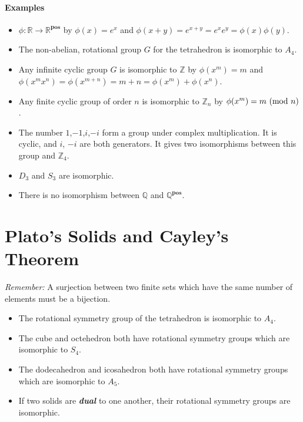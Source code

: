 \documentclass[a4paper,twocolumn,10pt]{article}
\begin{document}
  \paragraph{Examples}
  \begin{itemize}
    \item $\phi\colon \mathbb{R} \rightarrow \mathbb{R}^{\textbf{pos}}$ by
      $\phi{(x)} = e^x$ and $\phi{(x+y)}=e^{x+y}=e^xe^y=\phi{(x)}\phi{(y)}$.
    \item The non-abelian, rotational group $G$ for the tetrahedron is isomorphic to $A_4$.
    \item Any infinite cyclic group $G$ is isomorphic to $\mathbb{Z}$ by
      $\phi{(x^m)} = m$ and $\phi{(x^mx^n)} =
      \phi{(x^{m+n})}=m+n=\phi{(x^m)}+\phi{(x^n)}$.
    \item Any finite cyclic group of order $n$ is isomorphic to $\mathbb{Z}_n$
      by $\phi{(x^m)} = m\ (\text{mod}\ n)$.
    \item The number $1$,$-1$,$i$,$-i$ form a group under complex
      multiplication. It is cyclic, and $i$, $-i$ are both generators. It gives
      two isomorphisms between this group and $\mathbb{Z}_4$.
    \item $D_3$ and $S_3$ are isomorphic.
    \item There is no isomorphism between $\mathbb{Q}$ and
      $\mathbb{Q}^{\textbf{pos}}$.
  \end{itemize}

  \section{Plato's Solids and Cayley's Theorem}
  \textit{Remember:} A surjection between two finite sets which have the same
  number of elements must be a bijection.

  \begin{itemize}
    \item The rotational symmetry group of the tetrahedron is isomorphic to
      $A_4$.

    \item The cube and octehedron both have rotational symmetry groups which
      are isomorphic to $S_4$.

    \item The dodecahedron and icosahedron both have rotational symmetry groups
      which are isomorphic to $A_5$.

    \item If two solids are \textbf{\textit{dual}} to one another, their
      rotational symmetry groups are isomorphic.
  \end{itemize}
\end{document}
